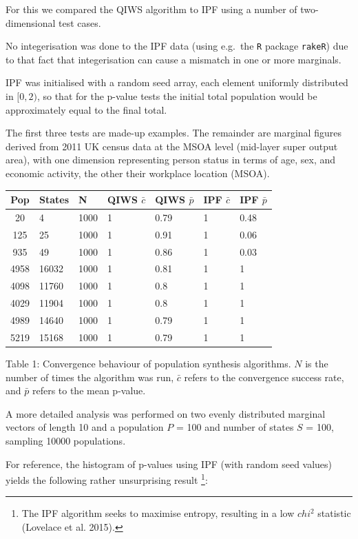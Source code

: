 \documentclass[]{article}
\let\rmarkdownfootnote\footnote%
\def\footnote{\protect\rmarkdownfootnote}
\begin{document}
For this we compared the QIWS algorithm to IPF using a number of
two-dimensional test cases.

No integerisation was done to the IPF data (using e.g.~the \texttt{R}
package \texttt{rakeR}) due to that fact that integerisation can cause a
mismatch in one or more marginals.

IPF was initialised with a random seed array, each element uniformly
distributed in \([0,2)\), so that for the p-value tests the initial total population would be 
approximately equal to the final total.

The first three tests are made-up examples. The remainder are marginal
figures derived from 2011 UK census data at the MSOA level (mid-layer
super output area), with one dimension representing person status in
terms of age, sex, and economic activity, the other their workplace
location (MSOA).

\begin{longtable}[]{@{}cllllll@{}}
\toprule
Pop & States & N & QIWS \(\bar{c}\) & QIWS \(\bar{p}\) & IPF \(\bar{c}\)
& IPF \(\bar{p}\)\tabularnewline
\midrule
\endhead
20 & 4 & 1000 & 1 & 0.79 & 1 & 0.48\tabularnewline
125 & 25 & 1000 & 1 & 0.91 & 1 & 0.06\tabularnewline
935 & 49 & 1000 & 1 & 0.86 & 1 & 0.03\tabularnewline
4958 & 16032 & 1000 & 1 & 0.81 & 1 & 1\tabularnewline
4098 & 11760 & 1000 & 1 & 0.8 & 1 & 1\tabularnewline
4029 & 11904 & 1000 & 1 & 0.8 & 1 & 1\tabularnewline
4989 & 14640 & 1000 & 1 & 0.79 & 1 & 1\tabularnewline
5219 & 15168 & 1000 & 1 & 0.79 & 1 & 1\tabularnewline
\bottomrule
\end{longtable}

\begin{center}
Table 1: Convergence behaviour of population synthesis algorithms. \(N\)
is the number of times the algorithm was run, \(\bar{c}\) refers to the
convergence success rate, and \(\bar{p}\) refers to the mean p-value.
\end{center}

A more detailed analysis was performed on two evenly distributed
marginal vectors of length 10 and a population \(P\) = 100 and number of
states \(S\) = 100, sampling 10000 populations.

For reference, the histogram of p-values using IPF (with random seed
values) yields the following rather unsurprising result \footnote{The IPF algorithm
 seeks to maximise entropy, resulting in a low $chi^2$ statistic (Lovelace et al. 2015).}:
\end{document}
